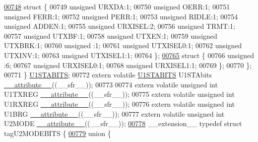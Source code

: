 \begin{DoxyCode}
\hypertarget{a00009_source_l00748}{}\hyperlink{a00009}{00748}     \textcolor{keyword}{struct }\{
00749       \textcolor{keywordtype}{unsigned} URXDA:1;
00750       \textcolor{keywordtype}{unsigned} OERR:1;
00751       \textcolor{keywordtype}{unsigned} FERR:1;
00752       \textcolor{keywordtype}{unsigned} PERR:1;
00753       \textcolor{keywordtype}{unsigned} RIDLE:1;
00754       \textcolor{keywordtype}{unsigned} ADDEN:1;
00755       \textcolor{keywordtype}{unsigned} URXISEL:2;
00756       \textcolor{keywordtype}{unsigned} TRMT:1;
00757       \textcolor{keywordtype}{unsigned} UTXBF:1;
00758       \textcolor{keywordtype}{unsigned} UTXEN:1;
00759       \textcolor{keywordtype}{unsigned} UTXBRK:1;
00760       \textcolor{keywordtype}{unsigned} :1;
00761       \textcolor{keywordtype}{unsigned} UTXISEL0:1;
00762       \textcolor{keywordtype}{unsigned} UTXINV:1;
00763       \textcolor{keywordtype}{unsigned} UTXISEL1:1;
00764     \};
\hypertarget{a00009_source_l00765}{}\hyperlink{a00009}{00765}     \textcolor{keyword}{struct }\{
00766       \textcolor{keywordtype}{unsigned} :6;
00767       \textcolor{keywordtype}{unsigned} URXISEL0:1;
00768       \textcolor{keywordtype}{unsigned} URXISEL1:1;
00769     \};
00770   \};
00771 \} \hyperlink{a00008_d0/d08/a00832}{U1STABITS};
00772 \textcolor{keyword}{extern} \textcolor{keyword}{volatile} \hyperlink{a00008_d0/d08/a00832}{U1STABITS} U1STAbits \hyperlink{a00009_a493c46f03454991ccc5aa7a6e1dfb2a7}{\_\_attribute\_\_}((\_\_sfr\_\_));
00773 
00774 \textcolor{keyword}{extern} \textcolor{keyword}{volatile} \textcolor{keywordtype}{unsigned} \textcolor{keywordtype}{int}  U1TXREG \hyperlink{a00009_a493c46f03454991ccc5aa7a6e1dfb2a7}{\_\_attribute\_\_}((\_\_sfr\_\_));
00775 \textcolor{keyword}{extern} \textcolor{keyword}{volatile} \textcolor{keywordtype}{unsigned} \textcolor{keywordtype}{int}  U1RXREG \hyperlink{a00009_a493c46f03454991ccc5aa7a6e1dfb2a7}{\_\_attribute\_\_}((\_\_sfr\_\_));
00776 \textcolor{keyword}{extern} \textcolor{keyword}{volatile} \textcolor{keywordtype}{unsigned} \textcolor{keywordtype}{int}  U1BRG \hyperlink{a00009_a493c46f03454991ccc5aa7a6e1dfb2a7}{\_\_attribute\_\_}((\_\_sfr\_\_));
00777 \textcolor{keyword}{extern} \textcolor{keyword}{volatile} \textcolor{keywordtype}{unsigned} \textcolor{keywordtype}{int}  U2MODE \hyperlink{a00009_a493c46f03454991ccc5aa7a6e1dfb2a7}{\_\_attribute\_\_}((\_\_sfr\_\_));
\hypertarget{a00009_source_l00778}{}\hyperlink{a00008}{00778} \_\_extension\_\_ \textcolor{keyword}{typedef} \textcolor{keyword}{struct }tagU2MODEBITS \{
\hypertarget{a00009_source_l00779}{}\hyperlink{a00009}{00779}   \textcolor{keyword}{union }\{

\end{DoxyCode}
